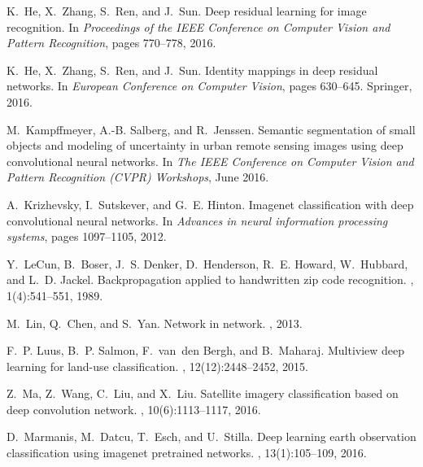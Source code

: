 \documentclass[journal]{IEEEtran}
\begin{document}
\begin{thebibliography}{1}
K.~He, X.~Zhang, S.~Ren, and J.~Sun.
\newblock Deep residual learning for image recognition.
\newblock In {\em Proceedings of the IEEE Conference on Computer Vision and
  Pattern Recognition}, pages 770--778, 2016.

K.~He, X.~Zhang, S.~Ren, and J.~Sun.
\newblock Identity mappings in deep residual networks.
\newblock In {\em European Conference on Computer Vision}, pages 630--645.
  Springer, 2016.

M.~Kampffmeyer, A.-B. Salberg, and R.~Jenssen.
\newblock Semantic segmentation of small objects and modeling of uncertainty in
  urban remote sensing images using deep convolutional neural networks.
\newblock In {\em The IEEE Conference on Computer Vision and Pattern
  Recognition (CVPR) Workshops}, June 2016.

A.~Krizhevsky, I.~Sutskever, and G.~E. Hinton.
\newblock Imagenet classification with deep convolutional neural networks.
\newblock In {\em Advances in neural information processing systems}, pages
  1097--1105, 2012.

Y.~LeCun, B.~Boser, J.~S. Denker, D.~Henderson, R.~E. Howard, W.~Hubbard, and
  L.~D. Jackel.
\newblock Backpropagation applied to handwritten zip code recognition.
, 1(4):541--551, 1989.

M.~Lin, Q.~Chen, and S.~Yan.
\newblock Network in network.
, 2013.

F.~P. Luus, B.~P. Salmon, F.~van~den Bergh, and B.~Maharaj.
\newblock Multiview deep learning for land-use classification.
, 12(12):2448--2452,
  2015.

Z.~Ma, Z.~Wang, C.~Liu, and X.~Liu.
\newblock Satellite imagery classification based on deep convolution network.
, 10(6):1113--1117, 2016.

D.~Marmanis, M.~Datcu, T.~Esch, and U.~Stilla.
\newblock Deep learning earth observation classification using imagenet
  pretrained networks.
, 13(1):105--109,
  2016.


\end{thebibliography}
\end{document}
